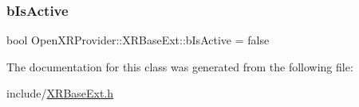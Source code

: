 \subsubsection{\texorpdfstring{bIsActive}{bIsActive}}
{\footnotesize\ttfamily bool Open\+X\+R\+Provider\+::\+X\+R\+Base\+Ext\+::b\+Is\+Active = false\hspace{0.3cm}{\ttfamily [private]}}



The documentation for this class was generated from the following file\+:\begin{DoxyCompactItemize}
\item 
include/\mbox{\hyperlink{_x_r_base_ext_8h}{X\+R\+Base\+Ext.\+h}}\end{DoxyCompactItemize}
